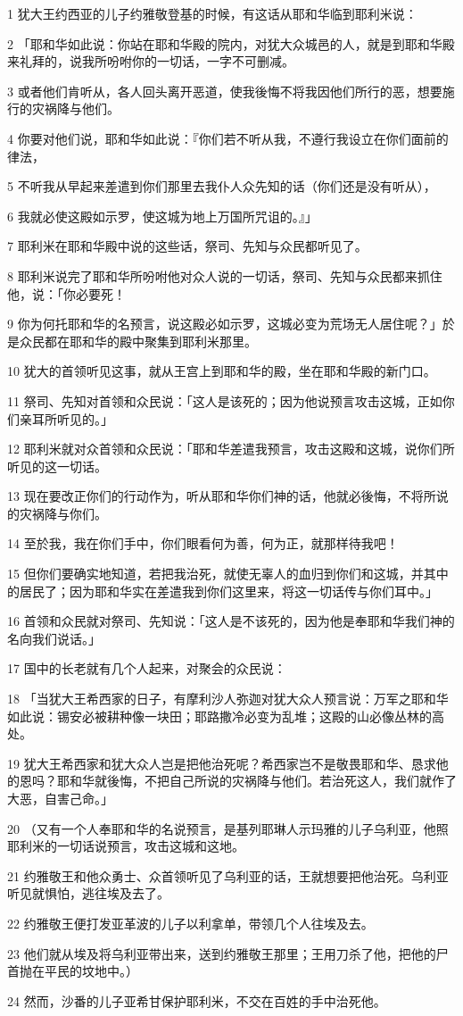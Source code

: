 \par 1 犹大王约西亚的儿子约雅敬登基的时候，有这话从耶和华临到耶利米说：
\par 2 「耶和华如此说：你站在耶和华殿的院内，对犹大众城邑的人，就是到耶和华殿来礼拜的，说我所吩咐你的一切话，一字不可删减。
\par 3 或者他们肯听从，各人回头离开恶道，使我後悔不将我因他们所行的恶，想要施行的灾祸降与他们。
\par 4 你要对他们说，耶和华如此说：『你们若不听从我，不遵行我设立在你们面前的律法，
\par 5 不听我从早起来差遣到你们那里去我仆人众先知的话（你们还是没有听从），
\par 6 我就必使这殿如示罗，使这城为地上万国所咒诅的。』」
\par 7 耶利米在耶和华殿中说的这些话，祭司、先知与众民都听见了。
\par 8 耶利米说完了耶和华所吩咐他对众人说的一切话，祭司、先知与众民都来抓住他，说：「你必要死！
\par 9 你为何托耶和华的名预言，说这殿必如示罗，这城必变为荒场无人居住呢？」於是众民都在耶和华的殿中聚集到耶利米那里。
\par 10 犹大的首领听见这事，就从王宫上到耶和华的殿，坐在耶和华殿的新门口。
\par 11 祭司、先知对首领和众民说：「这人是该死的；因为他说预言攻击这城，正如你们亲耳所听见的。」
\par 12 耶利米就对众首领和众民说：「耶和华差遣我预言，攻击这殿和这城，说你们所听见的这一切话。
\par 13 现在要改正你们的行动作为，听从耶和华你们神的话，他就必後悔，不将所说的灾祸降与你们。
\par 14 至於我，我在你们手中，你们眼看何为善，何为正，就那样待我吧！
\par 15 但你们要确实地知道，若把我治死，就使无辜人的血归到你们和这城，并其中的居民了；因为耶和华实在差遣我到你们这里来，将这一切话传与你们耳中。」
\par 16 首领和众民就对祭司、先知说：「这人是不该死的，因为他是奉耶和华我们神的名向我们说话。」
\par 17 国中的长老就有几个人起来，对聚会的众民说：
\par 18 「当犹大王希西家的日子，有摩利沙人弥迦对犹大众人预言说：万军之耶和华如此说：锡安必被耕种像一块田；耶路撒冷必变为乱堆；这殿的山必像丛林的高处。
\par 19 犹大王希西家和犹大众人岂是把他治死呢？希西家岂不是敬畏耶和华、恳求他的恩吗？耶和华就後悔，不把自己所说的灾祸降与他们。若治死这人，我们就作了大恶，自害己命。」
\par 20 （又有一个人奉耶和华的名说预言，是基列耶琳人示玛雅的儿子乌利亚，他照耶利米的一切话说预言，攻击这城和这地。
\par 21 约雅敬王和他众勇士、众首领听见了乌利亚的话，王就想要把他治死。乌利亚听见就惧怕，逃往埃及去了。
\par 22 约雅敬王便打发亚革波的儿子以利拿单，带领几个人往埃及去。
\par 23 他们就从埃及将乌利亚带出来，送到约雅敬王那里；王用刀杀了他，把他的尸首抛在平民的坟地中。）
\par 24 然而，沙番的儿子亚希甘保护耶利米，不交在百姓的手中治死他。

